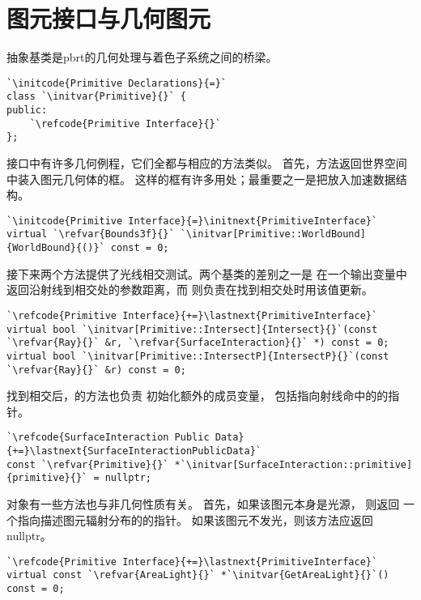 \section{图元接口与几何图元}\label{sec:图元接口与几何图元}

抽象基类是pbrt的几何处理与着色子系统之间的桥梁。
\begin{lstlisting}
`\initcode{Primitive Declarations}{=}`
class `\initvar{Primitive}{}` {
public:
    `\refcode{Primitive Interface}{}`
};
\end{lstlisting}

接口中有许多几何例程，它们全都与相应的方法类似。
首先，方法返回世界空间中装入图元几何体的框。
这样的框有许多用处；最重要之一是把放入加速数据结构。
\begin{lstlisting}
`\initcode{Primitive Interface}{=}\initnext{PrimitiveInterface}`
virtual `\refvar{Bounds3f}{}` `\initvar[Primitive::WorldBound]{WorldBound}{()}` const = 0;
\end{lstlisting}

接下来两个方法提供了光线相交测试。两个基类的差别之一是\linebreak
{}在一个输出变量中
返回沿射线到相交处的参数距离，而
则负责在找到相交处时用该值更新。
\begin{lstlisting}
`\refcode{Primitive Interface}{+=}\lastnext{PrimitiveInterface}`
virtual bool `\initvar[Primitive::Intersect]{Intersect}{}`(const `\refvar{Ray}{}` &r, `\refvar{SurfaceInteraction}{}` *) const = 0;
virtual bool `\initvar[Primitive::IntersectP]{IntersectP}{}`(const `\refvar{Ray}{}` &r) const = 0;
\end{lstlisting}

找到相交后，的方法也负责
初始化额外的\linebreak{}成员变量，
包括指向射线命中的的指针。
\begin{lstlisting}
`\refcode{SurfaceInteraction Public Data}{+=}\lastnext{SurfaceInteractionPublicData}`
const `\refvar{Primitive}{}` *`\initvar[SurfaceInteraction::primitive]{primitive}{}` = nullptr;
\end{lstlisting}

对象有一些方法也与非几何性质有关。
首先，如果该图元本身是光源，
则返回
一个指向描述图元辐射分布的的指针。
如果该图元不发光，则该方法应返回{\ttfamily nullptr}。
\begin{lstlisting}
`\refcode{Primitive Interface}{+=}\lastnext{PrimitiveInterface}`
virtual const `\refvar{AreaLight}{}` *`\initvar{GetAreaLight}{}`() const = 0;
\end{lstlisting}

